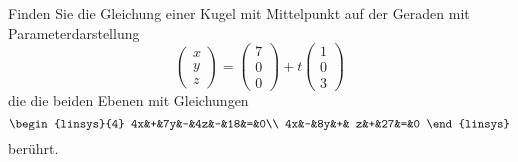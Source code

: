 Finden Sie die Gleichung einer Kugel mit Mittelpunkt auf der Geraden
mit Parameterdarstellung
\[
\begin{pmatrix}x\\y\\z\end{pmatrix}
=
\begin{pmatrix} 7\\0\\0 \end{pmatrix}
+t
\begin{pmatrix}1\\0\\3\end{pmatrix}
\]
die die beiden Ebenen mit Gleichungen
\[
\begin{linsys}{4}
4x&+&7y&-&4z&-&18&=&0\\
4x&-&8y&+& z&+&27&=&0
\end{linsys}
\]
berührt.


